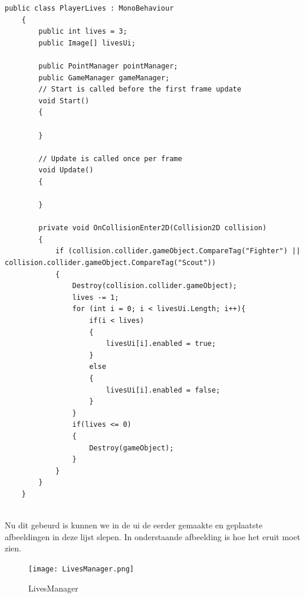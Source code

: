 \begin{lstlisting}[style=csharp]
    public class PlayerLives : MonoBehaviour
    {
        public int lives = 3;
        public Image[] livesUi;
        
        public PointManager pointManager;
        public GameManager gameManager;
        // Start is called before the first frame update
        void Start()
        {
            
        }
        
        // Update is called once per frame
        void Update()
        {
            
        }
        
        private void OnCollisionEnter2D(Collision2D collision)
        {
            if (collision.collider.gameObject.CompareTag("Fighter") || collision.collider.gameObject.CompareTag("Scout"))
            {
                Destroy(collision.collider.gameObject);
                lives -= 1;
                for (int i = 0; i < livesUi.Length; i++){
                    if(i < lives)
                    {
                        livesUi[i].enabled = true;
                    }
                    else
                    {
                        livesUi[i].enabled = false;
                    }
                }
                if(lives <= 0)
                {
                    Destroy(gameObject);
                }
            }
        }
    }
    
\end{lstlisting}
Nu dit gebeurd is kunnen we in de ui de eerder gemaakte en geplaatste afbeeldingen in deze lijst slepen. In onderstaande afbeelding is hoe het eruit moet zien.

\begin{figure}[H]
    \centering
    \texttt{[image: LivesManager.png]}
    \caption{LivesManager}
    \label{fig:LivesManager}
\end{figure}

